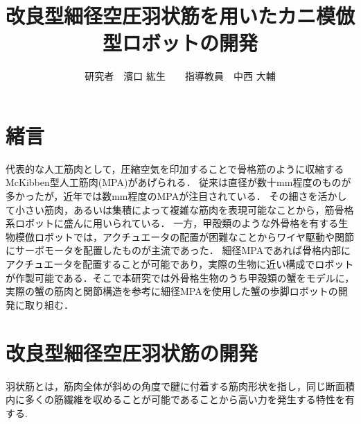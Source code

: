 \documentclass{jarticle}
\begin{document}

\title{
改良型細径空圧羽状筋を用いたカニ模倣型ロボットの開発
}
\author{
\centering
研究者　濱口 紘生　　指導教員　中西 大輔
}

\maketitle

\thispagestyle{empty}  %

\section{緒言}

代表的な人工筋肉として，圧縮空気を印加することで骨格筋のように収縮するMcKibben型人工筋肉(MPA)があげられる．
従来は直径が数十mm程度のものが多かったが，近年では数mm程度のMPAが注目されている\cite{wakimoto}．
その細さを活かして小さい筋肉，あるいは集積によって複雑な筋肉を表現可能なことから，筋骨格系ロボットに盛んに用いられている\cite{wakimoto}．
一方，甲殻類のような外骨格を有する生物模倣ロボットでは，アクチュエータの配置が困難なことからワイヤ駆動や関節にサーボモータを配置したものが主流であった\cite{crabrobot1}．
細径MPAであれば骨格内部にアクチュエータを配置することが可能であり，実際の生物に近い構成でロボットが作製可能である．そこで本研究では外骨格生物のうち甲殻類の蟹をモデルに，
実際の蟹の筋肉と関節構造を参考に細径MPAを使用した蟹の歩脚ロボットの開発に取り組む．


\section{改良型細径空圧羽状筋の開発}
羽状筋とは，筋肉全体が斜めの角度で腱に付着する筋肉形状を指し，同じ断面積内に多くの筋繊維を収めることが可能であることから高い力を発生する特性を有する.
\end{document}
